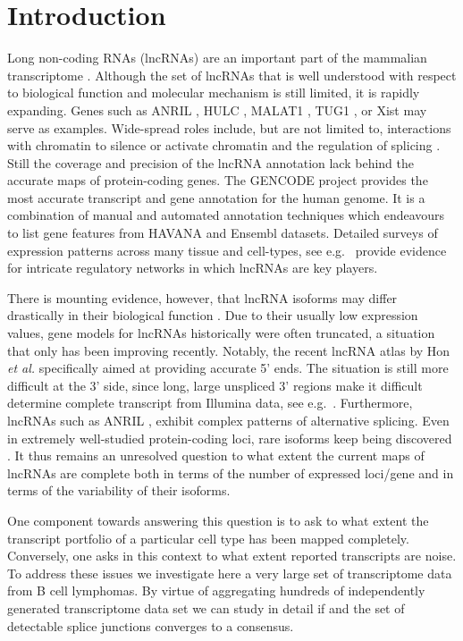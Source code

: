 \documentclass[ncrna,article,submit,moreauthors,pdftex,10pt,a4paper]{mdpi}
\begin{document}
\section{Introduction}

Long non-coding RNAs (lncRNAs) are an important part of the mammalian
transcriptome \cite{Clark:11a,ENCODE:12}. Although the set of lncRNAs that
is well understood with respect to biological function and molecular
mechanism is still limited, it is rapidly expanding. Genes such as ANRIL
\cite{Li:16A,Aguilo:16}, HULC \cite{Yu:17}, MALAT1 \cite{Liu:17}, TUG1
\cite{Li:16}, or Xist \cite{daRocha:17} may serve as examples. Wide-spread
roles include, but are not limited to, interactions with chromatin to
silence or activate chromatin \cite{guttmannat2012,Deng:16} and the
regulation of splicing \cite{Luco:16}. Still the coverage and precision of
the lncRNA annotation lack behind the accurate maps of protein-coding
genes.  The GENCODE project \cite{harrow2012} provides the most accurate
transcript and gene annotation for the human genome. It is a combination of
manual and automated annotation techniques which endeavours to list gene
features from HAVANA and Ensembl datasets. Detailed surveys of expression
patterns across many tissue and cell-types, see e.g.\
\cite{cabili2011,MasPonte:17,Hon:17} provide evidence for intricate
regulatory networks in which lncRNAs are key players.

There is mounting evidence, however, that lncRNA isoforms may differ
drastically in their biological function \cite{Holdt:13a,Bozgeyik:16}. Due
to their usually low expression values, gene models for lncRNAs historically
were often truncated, a situation that only has been improving recently.
Notably, the recent lncRNA atlas by Hon \emph{et al.} \cite{Hon:17}
specifically aimed at providing accurate 5' ends. The situation is still
more difficult at the 3' side, since long, large unspliced 3' regions make
it difficult determine complete transcript from Illumina data, see e.g.\
\cite{Mercer:10,Engelhardt:15a}. Furthermore, lncRNAs such as ANRIL
\cite{Holdt:13a}, exhibit complex patterns of alternative splicing. Even in
extremely well-studied protein-coding loci, rare isoforms keep being
discovered \cite{Hoffmann:14a}. It thus remains an unresolved question to
what extent the current maps of lncRNAs are complete both in terms of the
number of expressed loci/gene and in terms of the variability of their
isoforms. 

One component towards answering this question is to ask to what extent the
transcript portfolio of a particular cell type has been mapped completely.
Conversely, one asks in this context to what extent reported transcripts are
noise. To address these issues we investigate here a very large set of
transcriptome data from B cell lymphomas. By virtue of aggregating hundreds
of independently generated transcriptome data set we can study in detail if
and the set of detectable splice junctions converges to a consensus.
\end{document}
